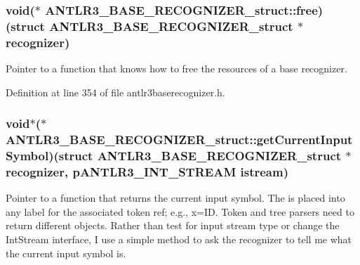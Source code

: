 \hypertarget{struct_a_n_t_l_r3___b_a_s_e___r_e_c_o_g_n_i_z_e_r__struct_a5bea95fd359401e60b2e904cb86da0ee}{
\subsubsection[{free}]{\setlength{\rightskip}{0pt plus 5cm}void($\ast$ A\-N\-T\-L\-R3\-\_\-\-B\-A\-S\-E\-\_\-\-R\-E\-C\-O\-G\-N\-I\-Z\-E\-R\-\_\-struct\-::free)(struct {\bf A\-N\-T\-L\-R3\-\_\-\-B\-A\-S\-E\-\_\-\-R\-E\-C\-O\-G\-N\-I\-Z\-E\-R\-\_\-struct} $\ast${\bf recognizer})}}\label{struct_a_n_t_l_r3___b_a_s_e___r_e_c_o_g_n_i_z_e_r__struct_a5bea95fd359401e60b2e904cb86da0ee}
Pointer to a function that knows how to free the resources of a base recognizer. 

Definition at line 354 of file antlr3baserecognizer.\-h.

\hypertarget{struct_a_n_t_l_r3___b_a_s_e___r_e_c_o_g_n_i_z_e_r__struct_ac4568c30a45bc9b1eb0ad72373ccc774}{
\subsubsection[{get\-Current\-Input\-Symbol}]{\setlength{\rightskip}{0pt plus 5cm}void$\ast$($\ast$ A\-N\-T\-L\-R3\-\_\-\-B\-A\-S\-E\-\_\-\-R\-E\-C\-O\-G\-N\-I\-Z\-E\-R\-\_\-struct\-::get\-Current\-Input\-Symbol)(struct {\bf A\-N\-T\-L\-R3\-\_\-\-B\-A\-S\-E\-\_\-\-R\-E\-C\-O\-G\-N\-I\-Z\-E\-R\-\_\-struct} $\ast${\bf recognizer}, {\bf p\-A\-N\-T\-L\-R3\-\_\-\-I\-N\-T\-\_\-\-S\-T\-R\-E\-A\-M} istream)}}\label{struct_a_n_t_l_r3___b_a_s_e___r_e_c_o_g_n_i_z_e_r__struct_ac4568c30a45bc9b1eb0ad72373ccc774}
Pointer to a function that returns the current input symbol. The is placed into any label for the associated token ref; e.\-g., x=I\-D. Token and tree parsers need to return different objects. Rather than test for input stream type or change the Int\-Stream interface, I use a simple method to ask the recognizer to tell me what the current input symbol is.

